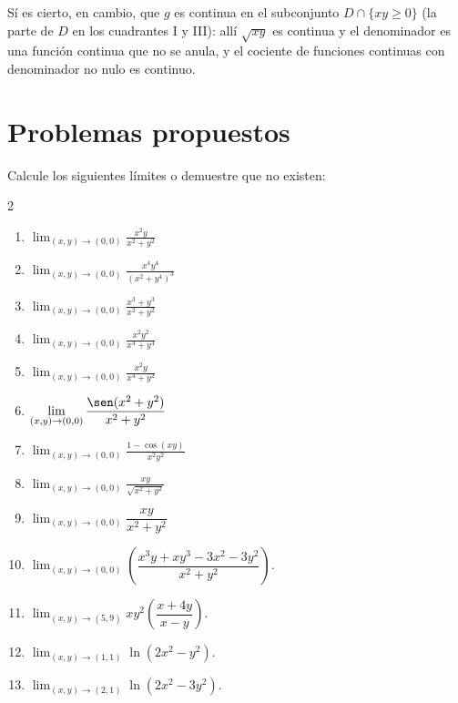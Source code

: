 \begin{rem}
Sí es cierto, en cambio, que $g$ es continua en el subconjunto
$D\cap\{xy\ge 0\}$ (la parte de $D$ en los cuadrantes I y III): allí
$\sqrt{xy}$ es continua y el denominador es una función continua que no se
anula, y el cociente de funciones continuas con denominador no nulo es
continuo.
\end{rem}

\section{Problemas propuestos}

\begin{prob}
Calcule los siguientes límites o demuestre que no existen:
\begin{multicols}{2}
\begin{enumerate}
    \item $\displaystyle\lim_{(x,y)\to(0,0)} \frac{x^2 y}{x^2+y^2}$
    \item $\displaystyle\lim_{(x,y)\to(0,0)} \frac{x^4 y^4}{(x^2+y^4)^3}$
    \item $\displaystyle\lim_{(x,y)\to(0,0)} \frac{x^3+y^3}{x^2+y^2}$
    \item $\displaystyle\lim_{(x,y)\to(0,0)} \frac{x^2 y^2}{x^4+y^4}$
    \item $\displaystyle\lim_{(x,y)\to(0,0)} \frac{x^2 y}{x^4+y^2}$
    \item $\displaystyle\lim_{(x,y)\to(0,0)} \frac{\sen(x^2+y^2)}{x^2+y^2}$
    \item $\displaystyle\lim_{(x,y)\to(0,0)} \frac{1-\cos(xy)}{x^2 y^2}$
    \item $\displaystyle\lim_{(x,y)\to(0,0)} \frac{x y}{\sqrt{x^2+y^2}}$
    \item $\displaystyle\lim_{(x,y)\to (0,0)} \dfrac{xy}{x^2+y^2}$
    \item $\displaystyle\lim_{(x,y)\to (0,0)}\left(\dfrac{x^3y+xy^3-3x^2-3y^2}{x^2+y^2}\right).$
    \item $\displaystyle\lim_{(x,y)\to (5,9)}xy^2\left(\dfrac{x+4y}{x-y}\right).$
    \item $\displaystyle\lim_{(x,y)\to (1,1)}\ln\left(2x^2-y^2\right).$
        \item $\displaystyle\lim_{(x,y)\to (2,1)}\ln\left(2x^2-3y^2\right).$
\end{enumerate}
\end{multicols}
\end{prob}


